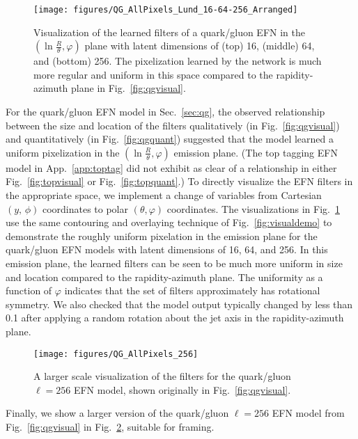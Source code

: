 \documentclass[letterpaper,11pt]{article}
\DeclareRobustCommand{\Sec}[1]{Sec.~\ref{#1}}
\DeclareRobustCommand{\App}[1]{App.~\ref{#1}}
\DeclareRobustCommand{\Fig}[1]{Fig.~\ref{#1}}
\begin{document}
\begin{figure}[p]
\centering
\texttt{[image: figures/QG\_AllPixels\_Lund\_16-64-256\_Arranged]}
\caption{Visualization of the learned filters of a quark/gluon EFN in the $(\ln\frac{R}{\theta},\varphi)$ plane with latent dimensions of (top) 16, (middle) 64, and (bottom) 256.
%
The pixelization learned by the network is much more regular and uniform in this space compared to the rapidity-azimuth plane in \Fig{fig:qgvisual}.
}
\label{fig:qglundvisual2}
\end{figure}


For the quark/gluon EFN model in \Sec{sec:qg}, the observed relationship between the size and location of the filters qualitatively (in \Fig{fig:qgvisual}) and quantitatively (in \Fig{fig:qgquant}) suggested that the model learned a uniform pixelization in the $\left(\ln\frac{R}{\theta},\varphi\right)$ emission plane.
%
(The top tagging EFN model in \App{app:toptag} did not exhibit as clear of a relationship in either \Fig{fig:topvisual} or \Fig{fig:topquant}.)
%
To directly visualize the EFN filters in the appropriate space, we implement a change of variables from Cartesian $(y,\,\phi)$ coordinates to polar $(\theta,\varphi)$ coordinates.
%
The visualizations in \Fig{fig:qglundvisual2} use the same contouring and overlaying technique of \Fig{fig:visualdemo} to demonstrate the roughly uniform pixelation in the emission plane for the quark/gluon EFN models with latent dimensions of 16, 64, and 256.
%
In this emission plane, the learned filters can be seen to be much more uniform in size and location compared to the rapidity-azimuth plane.
%
The uniformity as a function of $\varphi$ indicates that the set of filters approximately has rotational symmetry.
%
We also checked that the model output typically changed by less than 0.1 after applying a random rotation about the jet axis in the rapidity-azimuth plane.

\begin{figure}[t]
\centering
\texttt{[image: figures/QG\_AllPixels\_256]}
\caption{A larger scale visualization of the filters for the quark/gluon $\ell=256$ EFN model, shown originally in \Fig{fig:qgvisual}.}
\label{fig:qg256visual}
\end{figure}


Finally, we show a larger version of the quark/gluon $\ell = 256$ EFN model from \Fig{fig:qgvisual} in \Fig{fig:qg256visual}, suitable for framing.

\afterpage{\clearpage}


\end{document}
